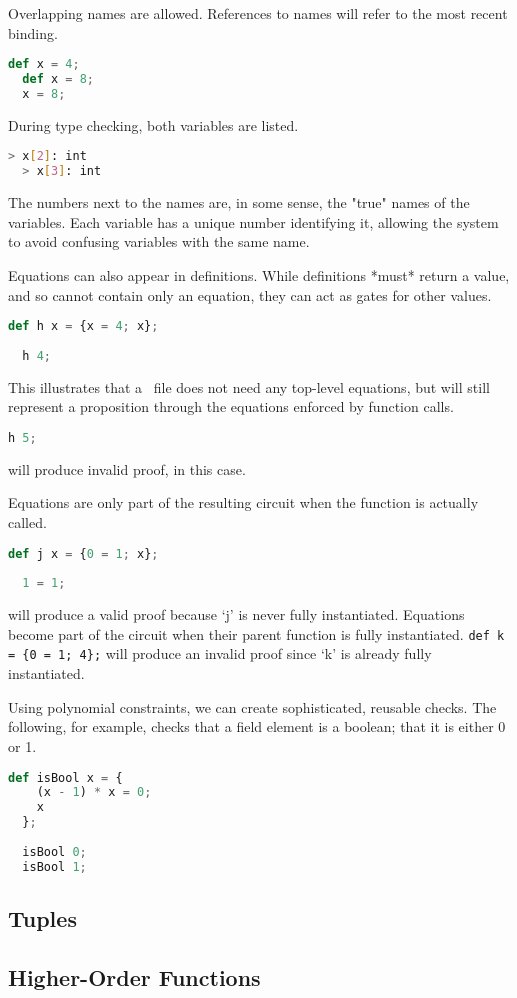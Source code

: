 Overlapping names are allowed. References to names will refer to the most recent binding.

\begin{lstlisting}[language=Python]
  def x = 4;
  def x = 8;
  x = 8;
\end{lstlisting}

During type checking, both variables are listed.

\begin{lstlisting}[language=bash]
  > x[2]: int
  > x[3]: int
\end{lstlisting}

The numbers next to the names are, in some sense, the "true" names of the variables. Each variable has a unique number identifying it, allowing the system to avoid confusing variables with the same name.

Equations can also appear in definitions. While definitions *must* return a value, and so cannot contain only an equation, they can act as gates for other values.


\begin{lstlisting}[language=Python]
  def h x = {x = 4; x};
  
  h 4;
\end{lstlisting}

This illustrates that a \vampir\ file does not need any top-level equations, but will still represent a proposition through the equations enforced by function calls.

\begin{lstlisting}[language=Python]
  h 5;
\end{lstlisting}

will produce invalid proof, in this case.

Equations are only part of the resulting circuit when the function is actually called.

\begin{lstlisting}[language=Python]
  def j x = {0 = 1; x};
  
  1 = 1;
\end{lstlisting}

will produce a valid proof because `j' is never fully instantiated. Equations become part of the circuit when their parent function is fully instantiated. \lstinline|def k = {0 = 1; 4};| will produce an invalid proof since `k' is already fully instantiated.

Using polynomial constraints, we can create sophisticated, reusable checks. The following, for example, checks that a field element is a boolean; that it is either 0 or 1.

\begin{lstlisting}[language=Python]
  def isBool x = { 
    (x - 1) * x = 0;
    x
  };
  
  isBool 0;
  isBool 1;
\end{lstlisting}

\subsection{Tuples}



\subsection{Higher-Order Functions}

